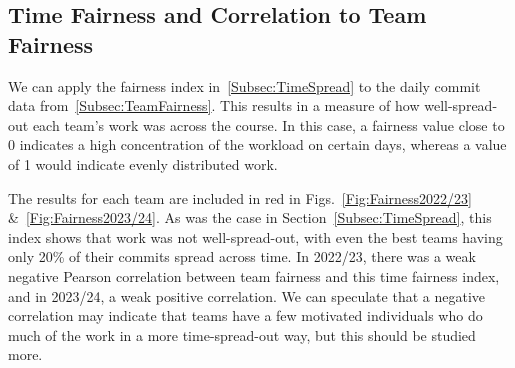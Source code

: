 \documentclass[10pt, conference]{IEEEtran}
\begin{document}
\subsection{Time Fairness and Correlation to Team Fairness}
We can apply the fairness index in~\ref{Subsec:TimeSpread}
to the daily commit data from~\ref{Subsec:TeamFairness}. This results in a
measure of how well-spread-out each team's work was across the course. In this case, 
a fairness value close to 0 indicates a high concentration of the workload on 
certain days, whereas a value of 1 would indicate evenly distributed work.

The results for each team are included in red in
Figs.~\ref{Fig:Fairness2022/23} \&~\ref{Fig:Fairness2023/24}. As was the case in
Section~\ref{Subsec:TimeSpread}, this index shows that work was not well-spread-out,
with even the best teams having only 20\% of their commits spread across time.
In 2022/23, there was a weak negative Pearson correlation between team fairness and this
time fairness index, and in 2023/24, a weak positive correlation. We can
speculate that a negative correlation may indicate that teams have a few motivated
individuals who do much of the work in a more time-spread-out way, but this should be
studied more.

\end{document}
